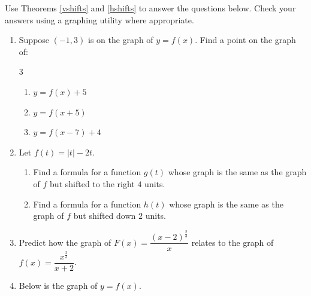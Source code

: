 \documentclass{ximera}
\begin{document}
 \begin{example} \label{shiftex}  Use Theorems  \ref{vshifts} and \ref{hshifts} to answer the questions below.  Check your answers using a graphing utility where appropriate.
 
 \begin{enumerate}
 
 \item  Suppose $(-1,3)$ is on the graph of $y = f(x)$.  Find a point on the graph of:
 
 \begin{multicols}{3}
 
 \begin{enumerate}
 
 \item $y = f(x)+5$
 
 \item $y = f(x+5)$
 
 \item  $y = f(x-7)+4$
 
 \end{enumerate}
 
 \end{multicols}
 
 \item  Let $f(t) = |t|-2t$.
 

 
 \begin{enumerate}
 
 \item Find a formula for a function $g(t)$ whose graph is the same as the graph of $f$ but shifted to the right $4$ units.
 
 \item Find a formula for a function $h(t)$ whose graph is the same as the graph of $f$ but shifted down $2$ units.
 
 \end{enumerate}
 
 \item Predict how the graph of $F(x) = \dfrac{(x-2)^{\frac{2}{3}}}{x}$ relates to the graph of $f(x) = \dfrac{x^{\frac{2}{3}}}{x+2}$. 
 
\item  Below is the graph of $y = f(x)$.  


\begin{image}


\end{image}
\end{enumerate}
\end{example}
\end{document}
